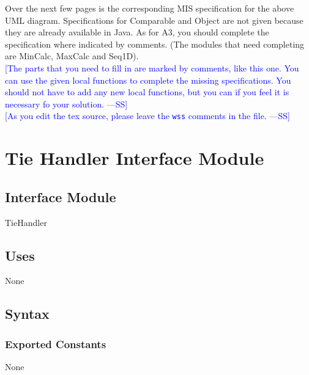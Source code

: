 \documentclass[12pt,fleqn]{examtst}
\newcommand{\authornote}[3]{\textcolor{#1}{[#3 ---#2]}}
\newcommand{\authornote}[3]{}
\newcommand{\wss}[1]{\authornote{blue}{SS}{#1}}
\begin{document}
\noindent
\begin{minipage}{\textwidth}
 \label{Q_CompleteMIS}

Over the next few pages is the corresponding MIS specification for the above UML
diagram.  Specifications for Comparable and Object are not given because they
are already available in Java.  As for A3, you should complete the specification
where indicated by comments.  (The modules that need completing are MinCalc,
MaxCalc and Seq1D).\\

\wss{The parts that you need to fill in are marked by comments, like this one.
You can use the given local functions to complete the missing specifications.
You should not have to add any new local functions, but you can if you feel it
is necessary fo your solution.}\\

\wss{As you edit the tex source, please leave the \texttt{wss} comments in the
  file.}\\

\end{minipage}


\newpage

\section* {Tie Handler Interface Module}

\subsection*{Interface Module}

TieHandler

\subsection* {Uses}

None

\subsection* {Syntax}

\subsubsection* {Exported Constants}

None
\end{document}
